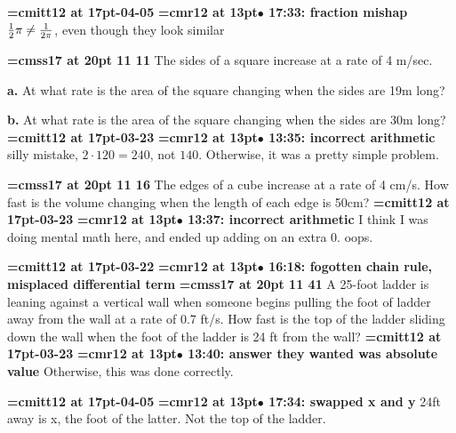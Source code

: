 {\medskip\noindent\bf\font\titlefont=cmitt12 at 17pt-04-05}\medskip
{\smallskip\noindent\bf\font\titlefont=cmr12 at 13pt\titlefont $\bullet$ 17:33: fraction mishap}\smallskip
${1 \over 2} \pi \ne {1 \over 2\pi}$, even though they look similar
\par

{\medskip\noindent\bf\font\titlefont=cmss17 at 20pt 11 11}\medskip
The sides of a square increase at a rate of 4 m/sec.
\par {\bf a.}
At what rate is the area of the square changing
when the sides are 19m long?
\par {\bf b.}
At what rate is the area of the square changing
when the sides are 30m long?
{\medskip\noindent\bf\font\titlefont=cmitt12 at 17pt-03-23}\medskip
{\smallskip\noindent\bf\font\titlefont=cmr12 at 13pt\titlefont $\bullet$ 13:35: incorrect arithmetic}\smallskip
silly mistake, $2\cdot 120=240$, not $140$. Otherwise, it was a pretty simple problem.
\par

{\medskip\noindent\bf\font\titlefont=cmss17 at 20pt 11 16}\medskip
The edges of a cube increase at a rate of 4 cm/s. How
fast is the volume changing when the length of each edge
is 50cm?
{\medskip\noindent\bf\font\titlefont=cmitt12 at 17pt-03-23}\medskip
{\smallskip\noindent\bf\font\titlefont=cmr12 at 13pt\titlefont $\bullet$ 13:37: incorrect arithmetic}\smallskip
I think I was doing mental math here, and ended up adding on an extra 0. oops.
\par

{\medskip\noindent\bf\font\titlefont=cmitt12 at 17pt-03-22}\medskip
{\smallskip\noindent\bf\font\titlefont=cmr12 at 13pt\titlefont $\bullet$ 16:18: fogotten chain rule, misplaced differential term}\smallskip
{}
{\medskip\noindent\bf\font\titlefont=cmss17 at 20pt 11 41}\medskip
A 25-foot ladder is leaning against a vertical wall when someone
begins pulling the foot of ladder away from the wall at a rate
of 0.7 ft/s. How fast is the top of the ladder sliding down the wall
when the foot of the ladder is 24 ft from the wall?
{\medskip\noindent\bf\font\titlefont=cmitt12 at 17pt-03-23}\medskip
{\smallskip\noindent\bf\font\titlefont=cmr12 at 13pt\titlefont $\bullet$ 13:40: answer they wanted was absolute value}\smallskip
Otherwise, this was done correctly.
\par

{\medskip\noindent\bf\font\titlefont=cmitt12 at 17pt-04-05}\medskip
{\smallskip\noindent\bf\font\titlefont=cmr12 at 13pt\titlefont $\bullet$ 17:34: swapped x and y}\smallskip
24ft away is x, the foot of the latter. Not the top of the ladder.
\par

